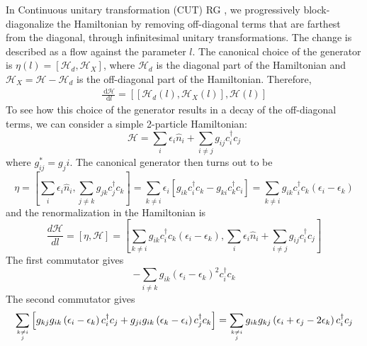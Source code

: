 \documentclass[twoside,11pt]{report}
\numberwithin{equation}{section}
\begin{document}
In Continuous unitary transformation (CUT) RG \cite{glazek-wilson}, we progressively block-diagonalize the Hamiltonian by removing off-diagonal terms that are farthest from the diagonal, through infinitesimal unitary transformations. The change is described as a flow against the parameter \(l\). The canonical choice of the generator is \(\eta(l) = \left[\mathcal{H}_d,\mathcal{H}_X\right]\), where \(\mathcal{H}_d\) is the diagonal part of the Hamiltonian and \(\mathcal{H}_X = \mathcal{H} - \mathcal{H}_d\) is the off-diagonal part of the Hamiltonian. Therefore,
\begin{equation}\begin{aligned}
	\label{cut}
	\frac{\:\mathrm{d}\mathcal{H}}{\:\mathrm{d}l} = \left[\left[\mathcal{H}_d(l),\mathcal{H}_X(l)\right],\mathcal{H}(l)\right]
\end{aligned}\end{equation}
To see how this choice of the generator results in a decay of the off-diagonal terms, we can consider a simple 2-particle Hamiltonian:
\begin{equation}
	\mathcal{H} = \sum_i \epsilon_i \hat n_i + \sum_{i\neq j} g_{ij}c^\dagger_i c_j
\end{equation}
where \(g_{ij}^* = g_ji\). The canonical generator then turns out to be 
\begin{equation}
	\eta = \left[\sum_i \epsilon_i \hat n_i, \sum_{j\neq k} g_{jk}c^\dagger_j c_k\right] = \sum_{k\neq i} \epsilon_i\left[g_{ik}c^\dagger_i c_k - g_{ki}c^\dagger_k c_i\right] = \sum_{k\neq i} g_{ik}c^\dagger_i c_k \left(\epsilon_i - \epsilon_k\right)
\end{equation}
and the renormalization in the Hamiltonian is
\begin{equation}
	\frac{d\mathcal{H}}{dl} = \left[\eta, \mathcal{H}\right] = \left[\sum_{k\neq i} g_{ik}c^\dagger_i c_k \left(\epsilon_i - \epsilon_k\right), \sum_i \epsilon_i \hat n_i + \sum_{i\neq j} g_{ij}c^\dagger_i c_j\right]
\end{equation}
The  first commutator gives 
\begin{equation}
	-\sum_{i\neq k} g_{ik}\left(\epsilon_i - \epsilon_k\right)^2 c^\dagger_i c_k
\end{equation}
The second commutator gives
\begin{equation}
	\sum_{k\neq i\atop{j}}\left[g_{kj}g_{ik}\left(\epsilon_i - \epsilon_k\right) c^\dagger_i c_j + g_{ji}g_{ik}\left( \epsilon_k - \epsilon_i \right) c^\dagger_j c_k\right] = \sum_{k\neq i\atop{j}}g_{ik}g_{kj}\left( \epsilon_i + \epsilon_j - 2\epsilon_k \right) c^\dagger_i c_j
\end{equation}
\end{document}
